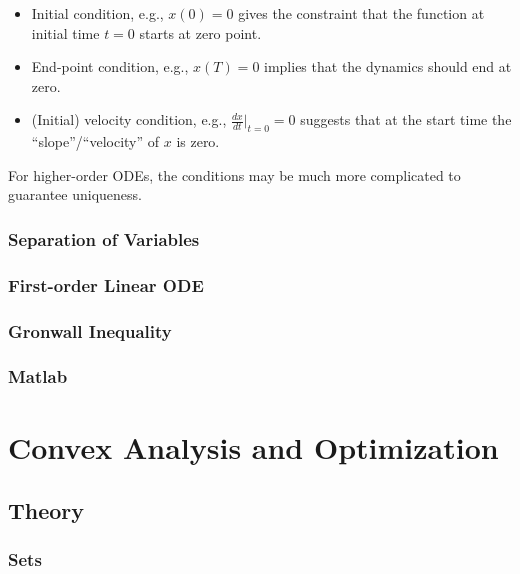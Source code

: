 \documentclass[
]{book}
\theoremstyle{definition}
\theoremstyle{definition}
\theoremstyle{definition}
\theoremstyle{definition}
\theoremstyle{remark}
\begin{document}
\begin{itemize}
\item
  Initial condition, e.g., \(x(0)=0\) gives the constraint that the function at initial time \(t=0\) starts at zero point.
\item
  End-point condition, e.g., \(x(T)=0\) implies that the dynamics should end at zero.
\item
  (Initial) velocity condition, e.g., \(\frac{dx}{dt}|_{t=0}=0\) suggests that at the start time the ``slope''/``velocity'' of \(x\) is zero.
\end{itemize}

For higher-order ODEs, the conditions may be much more complicated to guarantee uniqueness.

\hypertarget{separation-of-variables}{%
\subsection{Separation of Variables}\label{separation-of-variables}}

\hypertarget{first-order-linear-ode}{%
\subsection{First-order Linear ODE}\label{first-order-linear-ode}}

\hypertarget{gronwall-inequality}{%
\subsection{Gronwall Inequality}\label{gronwall-inequality}}

\hypertarget{matlab}{%
\subsection{Matlab}\label{matlab}}

\hypertarget{appconvex}{%
\chapter{Convex Analysis and Optimization}\label{appconvex}}

\hypertarget{appconvex-theory}{%
\section{Theory}\label{appconvex-theory}}

\hypertarget{sets}{%
\subsection{Sets}\label{sets}}
\end{document}
